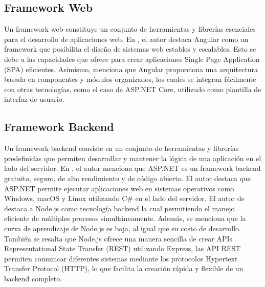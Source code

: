 \subsection{Framework Web}
Un framework web constituye un conjunto de herramientas y librerías esenciales para el desarrollo de aplicaciones web.
En \cite{chicaizavillegasAplicacionWebPara2023}, el autor destaca Angular como un framework que posibilita el diseño
de sistemas web estables y escalables. Esto se debe a las capacidades que ofrece para crear aplicaciones Single Page Application (SPA) eficientes.
Asimismo, menciona que Angular proporciona una arquitectura basada en componentes y módulos organizados, los cuales se
integran fácilmente con otras tecnologías, como el caso de ASP.NET Core, utilizado como plantilla de interfaz de usuario.

\subsection{Framework Backend}
Un framework backend consiste en un conjunto de herramientas y librerías predefinidas que permiten desarrollar y mantener
la lógica de una aplicación en el lado del servidor. En \cite{chicaizavillegasAplicacionWebPara2023}, el autor menciona
que ASP.NET es un framework backend gratuito, seguro, de alto rendimiento y de código abierto. El autor destaca que ASP.NET
permite ejecutar aplicaciones web en sistemas operativos como Windows, macOS y Linux utilizando C\# en el lado del servidor.
El autor de \cite{chasichangoAplicacionMovilApoyo2022} destaca a Node.js como tecnología backend  la cual permitiendo el
manejo eficiente de múltiples procesos simultáneamente. Además, se menciona que la curva de aprendizaje de Node.js es
baja, al igual que su costo de desarrollo. También se resalta que Node.js ofrece una manera sencilla de crear APIs Representational State Transfer (REST)
utilizando Express, las API REST permiten comunicar diferentes sistemas mediante los protocolos Hypertext Transfer Protocol (HTTP), lo que facilita
la creación rápida y flexible de un backend completo.

